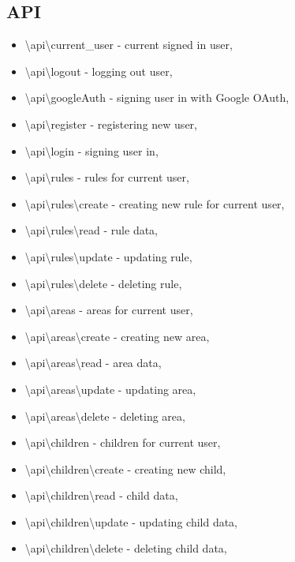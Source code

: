 \documentclass{sprawozdanie-agh}
\begin{document}
		\subsection{API}
		\begin{itemize}
			\item \textbackslash api\textbackslash current\_user - current signed in user,
			\item \textbackslash api\textbackslash logout - logging out user,
			\item \textbackslash api\textbackslash googleAuth - signing user in with Google OAuth,
			\item \textbackslash api\textbackslash register - registering new user,
			\item \textbackslash api\textbackslash login - signing user in,
			
			\item \textbackslash api\textbackslash rules - rules for current user,
			\item \textbackslash api\textbackslash rules\textbackslash create - creating new rule for current user,
			\item \textbackslash api\textbackslash rules\textbackslash read - rule data,
			\item \textbackslash api\textbackslash rules\textbackslash update - updating rule,
			\item \textbackslash api\textbackslash rules\textbackslash delete - deleting rule,
			
			\item \textbackslash api\textbackslash areas - areas for current user,
			\item \textbackslash api\textbackslash areas\textbackslash create - creating new area,
			\item \textbackslash api\textbackslash areas\textbackslash read - area data,
			\item \textbackslash api\textbackslash areas\textbackslash update - updating area,
			\item \textbackslash api\textbackslash areas\textbackslash delete - deleting area,
			
			\item \textbackslash api\textbackslash children - children for current user,
			\item \textbackslash api\textbackslash children\textbackslash create - creating new child,
			\item \textbackslash api\textbackslash children\textbackslash read - child data,
			\item \textbackslash api\textbackslash children\textbackslash update - updating child data,
			\item \textbackslash api\textbackslash children\textbackslash delete - deleting child data,
			
		\end{itemize}
\end{document}
